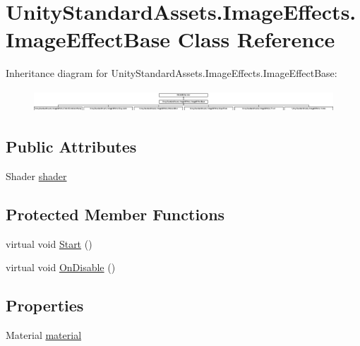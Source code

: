\hypertarget{class_unity_standard_assets_1_1_image_effects_1_1_image_effect_base}{}\section{Unity\+Standard\+Assets.\+Image\+Effects.\+Image\+Effect\+Base Class Reference}
\label{class_unity_standard_assets_1_1_image_effects_1_1_image_effect_base}
Inheritance diagram for Unity\+Standard\+Assets.\+Image\+Effects.\+Image\+Effect\+Base\+:\begin{figure}[H]
\begin{center}
\leavevmode
\includegraphics[height=0.828402cm]{class_unity_standard_assets_1_1_image_effects_1_1_image_effect_base}
\end{center}
\end{figure}
\subsection*{Public Attributes}
\begin{DoxyCompactItemize}
\item 
Shader \mbox{\hyperlink{class_unity_standard_assets_1_1_image_effects_1_1_image_effect_base_a8e9767f9fb7f9d66c187173cedfb5ccf}{shader}}
\end{DoxyCompactItemize}
\subsection*{Protected Member Functions}
\begin{DoxyCompactItemize}
\item 
virtual void \mbox{\hyperlink{class_unity_standard_assets_1_1_image_effects_1_1_image_effect_base_ae47320704d1e3516b307acffa5bd6116}{Start}} ()
\item 
virtual void \mbox{\hyperlink{class_unity_standard_assets_1_1_image_effects_1_1_image_effect_base_ae5e5daec47be729ff285431020e313fc}{On\+Disable}} ()
\end{DoxyCompactItemize}
\subsection*{Properties}
\begin{DoxyCompactItemize}
\item 
Material \mbox{\hyperlink{class_unity_standard_assets_1_1_image_effects_1_1_image_effect_base_a01be32995d707d066c79abd94e5089c2}{material}}
\end{DoxyCompactItemize}


